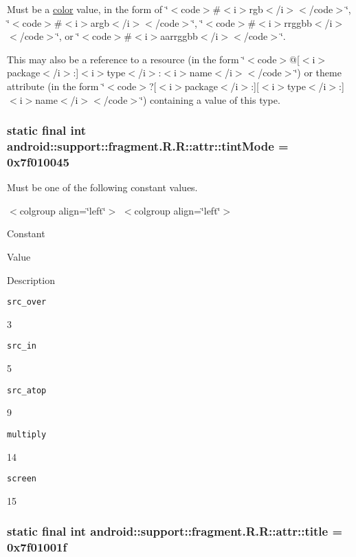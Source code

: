 Must be a \hyperlink{classandroid_1_1support_1_1fragment_1_1_r_1_1color}{color} value, in the form of \char`\"{}$<$code$>$\#$<$i$>$rgb$<$/i$>$$<$/code$>$\char`\"{}, \char`\"{}$<$code$>$\#$<$i$>$argb$<$/i$>$$<$/code$>$\char`\"{}, \char`\"{}$<$code$>$\#$<$i$>$rrggbb$<$/i$>$$<$/code$>$\char`\"{}, or \char`\"{}$<$code$>$\#$<$i$>$aarrggbb$<$/i$>$$<$/code$>$\char`\"{}. 

This may also be a reference to a resource (in the form \char`\"{}$<$code$>$@\mbox{[}$<$i$>$package$<$/i$>$:\mbox{]}$<$i$>$type$<$/i$>$:$<$i$>$name$<$/i$>$$<$/code$>$\char`\"{}) or theme attribute (in the form \char`\"{}$<$code$>$?\mbox{[}$<$i$>$package$<$/i$>$:\mbox{]}\mbox{[}$<$i$>$type$<$/i$>$:\mbox{]}$<$i$>$name$<$/i$>$$<$/code$>$\char`\"{}) containing a value of this type. \hypertarget{classandroid_1_1support_1_1fragment_1_1_r_1_1attr_b2b6b80b89a91fca56c9ed93a03f2f48}{
\subsubsection[{tintMode}]{\setlength{\rightskip}{0pt plus 5cm}static final int android::support::fragment.R.R::attr::tintMode = 0x7f010045}}
\label{classandroid_1_1support_1_1fragment_1_1_r_1_1attr_b2b6b80b89a91fca56c9ed93a03f2f48}


Must be one of the following constant values. \begin{TabularC}{0}
\hline
\end{TabularC}
$<$colgroup align=\char`\"{}left\char`\"{}$>$ $<$colgroup align=\char`\"{}left\char`\"{}$>$ 

Constant

Value

Description 

{\tt src\_\-over}

3

{\tt src\_\-in}

5

{\tt src\_\-atop}

9

{\tt multiply}

14

{\tt screen}

15\hypertarget{classandroid_1_1support_1_1fragment_1_1_r_1_1attr_e8d26cb8bebf67cfbd88106f6012c608}{
\subsubsection[{title}]{\setlength{\rightskip}{0pt plus 5cm}static final int android::support::fragment.R.R::attr::title = 0x7f01001f}}
\label{classandroid_1_1support_1_1fragment_1_1_r_1_1attr_e8d26cb8bebf67cfbd88106f6012c608}



